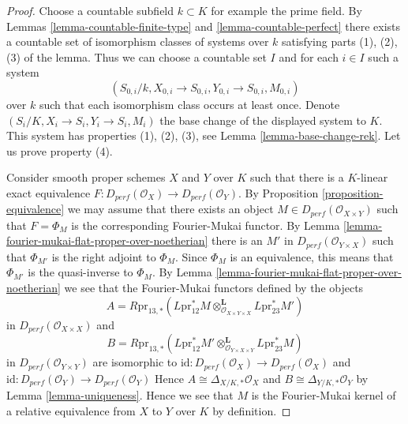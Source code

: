 \documentclass{stacks-project}
\theoremstyle{plain}
\theoremstyle{definition}
\theoremstyle{remark}
\numberwithin{equation}{subsection}
\begin{document}
\begin{proof}
Choose a countable subfield $k \subset K$ for example the prime field.
By Lemmas \ref{lemma-countable-finite-type} and \ref{lemma-countable-perfect}
there exists a countable set of isomorphism classes of systems
over $k$ satisfying parts (1), (2), (3) of the lemma.
Thus we can choose a countable set
$I$ and for each $i \in I$ such a system
$$
(S_{0, i}/k, X_{0, i} \to S_{0, i}, Y_{0, i} \to S_{0, i}, M_{0, i})
$$
over $k$ such that each isomorphism class occurs at least once.
Denote $(S_i/K, X_i \to S_i, Y_i \to S_i, M_i)$ the base change
of the displayed system to $K$. This system has properties (1), (2), (3),
see Lemma \ref{lemma-base-change-rek}. Let us prove property (4).

\medskip\noindent
Consider smooth proper schemes $X$ and $Y$ over $K$
such that there is a $K$-linear exact equivalence
$F : D_{perf}(\mathcal{O}_X) \to D_{perf}(\mathcal{O}_Y)$.
By Proposition \ref{proposition-equivalence}
we may assume that there exists an object
$M \in D_{perf}(\mathcal{O}_{X \times Y})$
such that $F = \Phi_M$ is the corresponding Fourier-Mukai functor.
By Lemma \ref{lemma-fourier-mukai-flat-proper-over-noetherian}
there is an $M'$ in $D_{perf}(\mathcal{O}_{Y \times X})$
such that $\Phi_{M'}$ is the right adjoint to $\Phi_M$.
Since $\Phi_M$ is an equivalence, this means that
$\Phi_{M'}$ is the quasi-inverse to $\Phi_M$.
By Lemma \ref{lemma-fourier-mukai-flat-proper-over-noetherian}
we see that the Fourier-Mukai functors defined by the objects
$$
A = R\text{pr}_{13, *}(
L\text{pr}_{12}^*M
\otimes_{\mathcal{O}_{X \times Y \times X}}^\mathbf{L}
L\text{pr}_{23}^*M')
$$
in $D_{perf}(\mathcal{O}_{X \times X})$ and
$$
B = R\text{pr}_{13, *}(
L\text{pr}_{12}^*M'
\otimes_{\mathcal{O}_{Y \times X \times Y}}^\mathbf{L}
L\text{pr}_{23}^*M)
$$
in $D_{perf}(\mathcal{O}_{Y \times Y})$ 
are isomorphic to
$\text{id} : D_{perf}(\mathcal{O}_X) \to D_{perf}(\mathcal{O}_X)$
and
$\text{id} : D_{perf}(\mathcal{O}_Y) \to D_{perf}(\mathcal{O}_Y)$
Hence
$A \cong \Delta_{X/K, *}\mathcal{O}_X$ and
$B \cong \Delta_{Y/K, *}\mathcal{O}_Y$
by Lemma \ref{lemma-uniqueness}. Hence we see that $M$ is the
Fourier-Mukai kernel of a relative equivalence from $X$ to $Y$
over $K$ by definition.


\end{proof}
\end{document}
